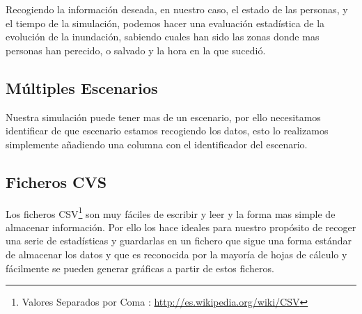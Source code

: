 Recogiendo la información deseada, en nuestro caso, el estado de las personas,
y el tiempo de la simulación, podemos hacer una evaluación estadística de la
evolución de la inundación, sabiendo cuales han sido las zonas donde mas
personas han perecido, o salvado y la hora en la que sucedió.
\subsection*{Múltiples Escenarios}
Nuestra simulación puede tener mas de un escenario, por ello necesitamos
identificar de que escenario estamos recogiendo los datos, esto lo realizamos
simplemente añadiendo una columna con el identificador del escenario.
\subsection*{Ficheros CVS}
Los ficheros CSV\footnote{Valores Separados por Coma :
\url{http://es.wikipedia.org/wiki/CSV}} son muy fáciles de escribir y leer y la
forma mas simple de almacenar información. Por ello los hace ideales para
nuestro propósito de recoger una serie de estadísticas y guardarlas en un
fichero que sigue una forma estándar de almacenar los datos y que es reconocida
por la mayoría de hojas de cálculo y fácilmente se pueden generar gráficas a 
partir de estos ficheros.
